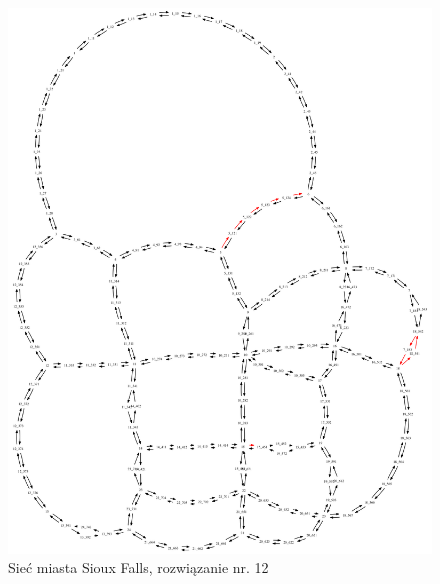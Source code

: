 \documentclass[twoside,12pt]{report}
\begin{document}
\begin{figure}[ht]
\centering
\includegraphics[totalheight=0.580\textheight, angle=90]{img/sioux-out/12/network2}
\caption{Sieć miasta Sioux Falls, rozwiązanie nr. 12}
\label{sioux12}
\end{figure}
\end{document}
